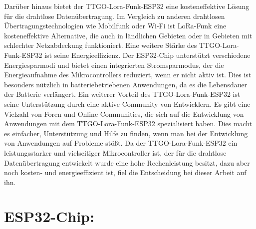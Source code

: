 Darüber hinaus bietet der TTGO-Lora-Funk-ESP32 eine kosteneffektive Lösung für die drahtlose Datenübertragung. Im Vergleich zu anderen drahtlosen Übertragungstechnologien wie Mobilfunk oder Wi-Fi ist LoRa-Funk eine kosteneffektive Alternative, die auch in ländlichen Gebieten oder in Gebieten mit schlechter Netzabdeckung funktioniert.
Eine weitere Stärke des TTGO-Lora-Funk-ESP32 ist seine Energieeffizienz. Der ESP32-Chip unterstützt verschiedene Energiesparmodi und bietet einen integrierten Stromsparmodus, der die Energieaufnahme des Mikrocontrollers reduziert, wenn er nicht aktiv ist. Dies ist besonders nützlich in batteriebetriebenen Anwendungen, da es die Lebensdauer der Batterie verlängert.
Ein weiterer Vorteil des TTGO-Lora-Funk-ESP32 ist seine Unterstützung durch eine aktive Community von Entwicklern. Es gibt eine Vielzahl von Foren und Online-Communities, die sich auf die Entwicklung von Anwendungen mit dem TTGO-Lora-Funk-ESP32 spezialisiert haben. Dies macht es einfacher, Unterstützung und Hilfe zu finden, wenn man bei der Entwicklung von Anwendungen auf Probleme stößt.
Da der TTGO-Lora-Funk-ESP32 ein leistungsstarker und vielseitiger Mikrocontroller ist, der für die drahtlose Datenübertragung entwickelt wurde eine hohe Rechenleistung besitzt, dazu aber noch kosten- und energieeffizient ist, fiel die Entscheidung bei dieser Arbeit auf ihn.


\newpage
\section{ESP32-Chip:}


